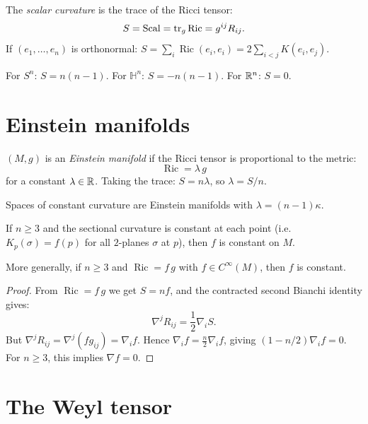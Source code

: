 \begin{definition}
The \emph{scalar curvature} is the trace of the Ricci tensor:
\[
    S = \operatorname{Scal} = \mathrm{tr}_g \operatorname{Ric} = g^{ij} R_{ij}.
\]
If $(e_1, \ldots, e_n)$ is orthonormal:
$S = \sum_{i} \operatorname{Ric}(e_i, e_i) = 2\sum_{i < j} K(e_i, e_j)$.
\end{definition}

\begin{example}
For $S^n$: $S = n(n-1)$. For $\mathbb{H}^n$: $S = -n(n-1)$. For $\mathbb{R}^n$: $S = 0$.
\end{example}

\section{Einstein manifolds}

\begin{definition}
$(M, g)$ is an \emph{Einstein manifold} if the Ricci tensor is proportional to
the metric:
\[
    \operatorname{Ric} = \lambda\, g
\]
for a constant $\lambda \in \mathbb{R}$. Taking the trace: $S = n\lambda$, so $\lambda = S/n$.
\end{definition}

\begin{example}
Spaces of constant curvature are Einstein manifolds with $\lambda = (n-1)\kappa$.
\end{example}

\begin{theorem}[Schur]
If $n \geq 3$ and the sectional curvature is constant at each point (i.e.\
$K_p(\sigma) = f(p)$ for all $2$-planes $\sigma$ at $p$), then $f$ is constant
on $M$.

More generally, if $n \geq 3$ and $\operatorname{Ric} = f\, g$ with
$f \in C^\infty(M)$, then $f$ is constant.
\end{theorem}

\begin{proof}
From $\operatorname{Ric} = f\, g$ we get $S = nf$, and the contracted second
Bianchi identity gives:
\[
    \nabla^j R_{ij} = \frac{1}{2}\nabla_i S.
\]
But $\nabla^j R_{ij} = \nabla^j(fg_{ij}) = \nabla_i f$. Hence
$\nabla_i f = \frac{n}{2}\nabla_i f$, giving $(1 - n/2)\nabla_i f = 0$.
For $n \geq 3$, this implies $\nabla f = 0$.
\end{proof}

\section{The Weyl tensor}

